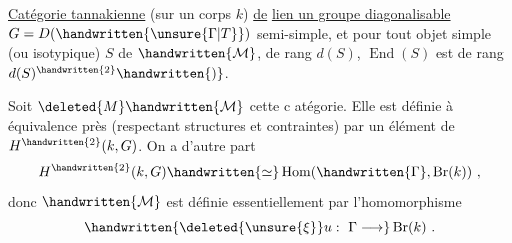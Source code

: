 \uline{Catégorie tannakienne} (sur un corps $k$) \uline{de}  \uline{lien un groupe diagonalisable} $G=D(\handwritten{\unsure{\Gamma|T}})$  semi-simple, et pour tout objet simple (ou isotypique) $S$ de $\handwritten{\mathcal{M}}$, de rang $d(S)$, $\operatorname{End}(S)$ est de rang $d(S)^{\handwritten{2}}\handwritten{)}$.

Soit $\deleted{M}\handwritten{\mathcal{M}}$ cette c atégorie. Elle est définie à équivalence près (respectant structures et contraintes) par un élément de $H^{\handwritten{2}}(k,G)$. On a d'autre part
\[
H^{\handwritten{2}}(k,G)\handwritten{\simeq}\operatorname{Hom}(\handwritten{\Gamma},\operatorname{Br}(k))\ ,
\]
donc $\handwritten{\mathcal{M}}$ est définie essentiellement par l'homomorphisme 
\[
\handwritten{\deleted{\unsure{\xi}}u:\ \Gamma\longrightarrow}\operatorname{Br}(k)\ .
\]

